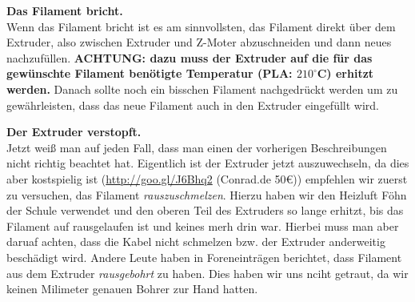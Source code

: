 \documentclass[11pt,a4paper]{scrartcl}
\begin{document}
\begin{description}
\item \textbf{Das Filament bricht.}\\
Wenn das Filament bricht ist es am sinnvollsten, das Filament direkt über dem Extruder, also zwischen Extruder und Z-Moter abzuschneiden und dann neues nachzufüllen. \textbf{ACHTUNG: dazu muss der Extruder auf die für das gewünschte Filament benötigte Temperatur (PLA: $210^\circ$C) erhitzt werden.} Danach sollte noch ein bisschen Filament nachgedrückt werden um zu gewährleisten, dass das neue Filament auch in den Extruder eingefüllt wird.
\vspace{10pt}

\item \textbf{Der Extruder verstopft.}\\
Jetzt weiß man auf jeden Fall, dass man einen der vorherigen Beschreibungen nicht richtig beachtet hat. Eigentlich ist der Extruder jetzt auszuwechseln, da dies aber kostspielig ist (\url{http://goo.gl/J6Bhq2} (Conrad.de 50\euro)) empfehlen wir zuerst zu versuchen, das Filament \textit{rauszuschmelzen}. Hierzu haben wir den Heizluft Föhn der Schule verwendet und den oberen Teil des Extruders so lange erhitzt, bis das Filament auf rausgelaufen ist und keines merh drin war. Hierbei muss man aber daruaf achten, dass die Kabel nicht schmelzen bzw. der Extruder anderweitig beschädigt wird. Andere Leute haben in Foreneinträgen berichtet, dass Filament aus dem Extruder \textit{rausgebohrt} zu haben. Dies haben wir uns nciht getraut, da wir keinen Milimeter genauen Bohrer zur Hand hatten.
\end{description}
\end{document}
